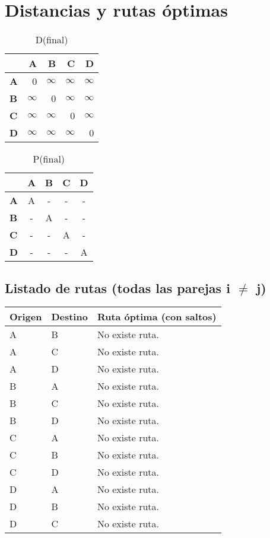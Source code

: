 \documentclass{article}
\newcommand{\INF}{$\infty$}
\begin{document}
\section*{Distancias y rutas óptimas}
\begin{table}[H]\centering
\caption{D(final)}
\begin{tabular}{l r r r r}
\toprule
 & \textbf{A} & \textbf{B} & \textbf{C} & \textbf{D}\\\midrule
\textbf{A} & 0 & \INF & \INF & \INF \\
\textbf{B} & \INF & 0 & \INF & \INF \\
\textbf{C} & \INF & \INF & 0 & \INF \\
\textbf{D} & \INF & \INF & \INF & 0 \\
\bottomrule
\end{tabular}
\end{table}

\begin{table}[H]\centering
\caption{P(final)}
\begin{tabular}{l c c c c}
\toprule
 & \textbf{A} & \textbf{B} & \textbf{C} & \textbf{D}\\\midrule
\textbf{A} & A & - & - & - \\
\textbf{B} & - & A & - & - \\
\textbf{C} & - & - & A & - \\
\textbf{D} & - & - & - & A \\
\bottomrule
\end{tabular}
\end{table}

\subsection*{Listado de rutas (todas las parejas i $\neq$ j)}
\begin{longtable}{llp{}}
\toprule
\textbf{Origen} & \textbf{Destino} & \textbf{Ruta óptima (con saltos)}\\\midrule
A & B & No existe ruta.\\
A & C & No existe ruta.\\
A & D & No existe ruta.\\
B & A & No existe ruta.\\
B & C & No existe ruta.\\
B & D & No existe ruta.\\
C & A & No existe ruta.\\
C & B & No existe ruta.\\
C & D & No existe ruta.\\
D & A & No existe ruta.\\
D & B & No existe ruta.\\
D & C & No existe ruta.\\
\bottomrule
\end{longtable}
\end{document}
